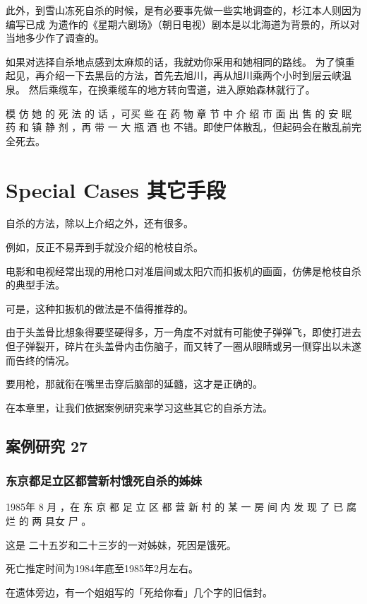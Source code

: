 \documentclass[UTF8]{ctexart}
\begin{document}
此外，到雪山冻死自杀的时候，是有必要事先做一些实地调查的，杉江本人则因为编写已成 为遗作的《星期六剧场》（朝日电视）剧本是以北海道为背景的，所以对当地多少作了调查的。

如果对选择自杀地点感到太麻烦的话，我就劝你采用和她相同的路线。
为了慎重起见，再介绍一下去黑岳的方法，首先去旭川，再从旭川乘两个小时到层云峡温泉。
然后乘缆车，在换乘缆车的地方转向雪道，进入原始森林就行了。

模 仿 她 的 死 法 的 话 ，可买 些 在 药 物 章 节 中 介 绍 市 面 出 售 的 安 眠 药 和 镇 静 剂 ，再 带 一 大 瓶 酒 也 不错。即使尸体散乱，但起码会在散乱前完全死去。



\newpage

\section{Special Cases 其它手段}

自杀的方法，除以上介绍之外，还有很多。

例如，反正不易弄到手就没介绍的枪枝自杀。

电影和电视经常出现的用枪口对准眉间或太阳穴而扣扳机的画面，仿佛是枪枝自杀的典型手法。

可是，这种扣扳机的做法是不值得推荐的。

由于头盖骨比想象得要坚硬得多，万一角度不对就有可能使子弹弹飞，即使打进去但子弹裂开，碎片在头盖骨内击伤脑子，而又转了一圈从眼睛或另一侧穿出以未遂而告终的情况。

要用枪，那就衔在嘴里击穿后脑部的延髓，这才是正确的。

在本章里，让我们依据案例研究来学习这些其它的自杀方法。



\subsection{案例研究 27}

\subsubsection*{东京都足立区都营新村饿死自杀的姊妹}

1985年 8 月 ，在 东 京 都 足 立 区 都 营 新 村 的 某 一 房 间 内 发 现 了 已 腐 烂 的 两 具女 尸 。

这是 二十五岁和二十三岁的一对姊妹，死因是饿死。

死亡推定时间为1984年底至1985年2月左右。

在遗体旁边，有一个姐姐写的「死给你看」几个字的旧信封。
\end{document}
